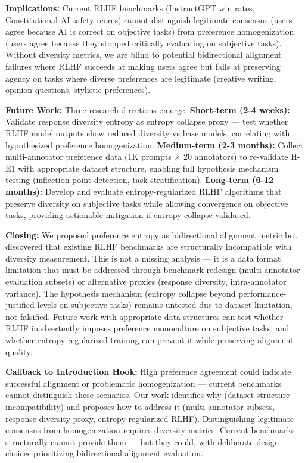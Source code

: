 \textbf{Implications:} Current RLHF benchmarks (InstructGPT win rates, Constitutional AI safety scores) cannot distinguish legitimate consensus (users agree because AI is correct on objective tasks) from preference homogenization (users agree because they stopped critically evaluating on subjective tasks). Without diversity metrics, we are blind to potential bidirectional alignment failures where RLHF succeeds at making users agree but fails at preserving agency on tasks where diverse preferences are legitimate (creative writing, opinion questions, stylistic preferences).

\textbf{Future Work:} Three research directions emerge. \textbf{Short-term (2-4 weeks):} Validate response diversity entropy as entropy collapse proxy — test whether RLHF model outputs show reduced diversity vs base models, correlating with hypothesized preference homogenization. \textbf{Medium-term (2-3 months):} Collect multi-annotator preference data (1K prompts $\times$ 20 annotators) to re-validate H-E1 with appropriate dataset structure, enabling full hypothesis mechanism testing (inflection point detection, task stratification). \textbf{Long-term (6-12 months):} Develop and evaluate entropy-regularized RLHF algorithms that preserve diversity on subjective tasks while allowing convergence on objective tasks, providing actionable mitigation if entropy collapse validated.

\textbf{Closing:} We proposed preference entropy as bidirectional alignment metric but discovered that existing RLHF benchmarks are structurally incompatible with diversity measurement. This is not a missing analysis — it is a data format limitation that must be addressed through benchmark redesign (multi-annotator evaluation subsets) or alternative proxies (response diversity, intra-annotator variance). The hypothesis mechanism (entropy collapse beyond performance-justified levels on subjective tasks) remains untested due to dataset limitation, not falsified. Future work with appropriate data structures can test whether RLHF inadvertently imposes preference monoculture on subjective tasks, and whether entropy-regularized training can prevent it while preserving alignment quality.

\textbf{Callback to Introduction Hook:} High preference agreement could indicate successful alignment or problematic homogenization — current benchmarks cannot distinguish these scenarios. Our work identifies why (dataset structure incompatibility) and proposes how to address it (multi-annotator subsets, response diversity proxy, entropy-regularized RLHF). Distinguishing legitimate consensus from homogenization requires diversity metrics. Current benchmarks structurally cannot provide them — but they could, with deliberate design choices prioritizing bidirectional alignment evaluation.
